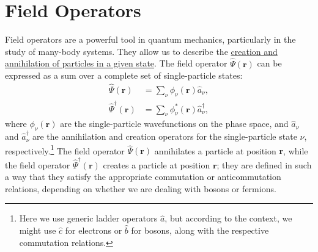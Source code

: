 \section{Field Operators}

Field operators are a powerful tool in quantum mechanics, particularly in the study of many-body systems. They allow us to describe the \uline{creation and annihilation of particles in a given state}. The field operator $\hat{\Psi}(\mathbf{r})$ can be expressed as a sum over a complete set of single-particle states:
\[
    \begin{aligned}
        \hat{\Psi}(\mathbf{r})         & = \sum_{\nu} \phi_\nu(\mathbf{r}) \hat{a}_\nu,           \\
        \hat{\Psi}^\dagger(\mathbf{r}) & = \sum_{\nu} \phi_\nu^*(\mathbf{r}) \hat{a}_\nu^\dagger,
    \end{aligned}
\]
where $\phi_\nu(\mathbf{r})$ are the single-particle wavefunctions on the phase space, and $\hat{a}_\nu$ and $\hat{a}_\nu^\dagger$ are the annihilation and creation operators for the single-particle state $\nu$, respectively.\footnote{Here we use generic ladder operators \(\hat{a}\), but according to the context, we might use \(\hat{c}\) for electrons or \(\hat{b}\) for bosons, along with the respective commutation relations.} The field operator $\hat{\Psi}(\mathbf{r})$ annihilates a particle at position $\mathbf{r}$, while the field operator $\hat{\Psi}^\dagger(\mathbf{r})$ creates a particle at position $\mathbf{r}$; they are defined in such a way that they satisfy the appropriate commutation or anticommutation relations, depending on whether we are dealing with bosons or fermions.

